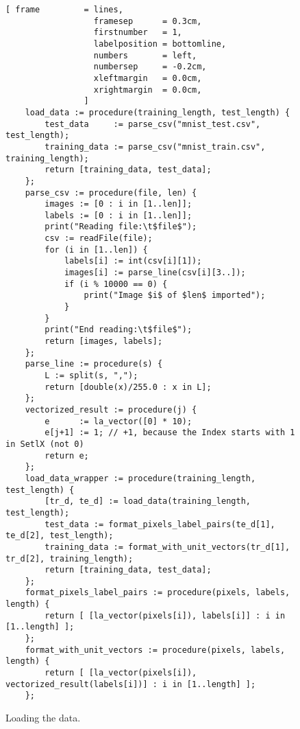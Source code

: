 \begin{figure}[!ht]
\centering
\begin{Verbatim}[ frame         = lines, 
                  framesep      = 0.3cm, 
                  firstnumber   = 1,
                  labelposition = bottomline,
                  numbers       = left,
                  numbersep     = -0.2cm,
                  xleftmargin   = 0.0cm,
                  xrightmargin  = 0.0cm,
                ]
    load_data := procedure(training_length, test_length) {
    	test_data     := parse_csv("mnist_test.csv",  test_length);
    	training_data := parse_csv("mnist_train.csv", training_length);
    	return [training_data, test_data];
    };
    parse_csv := procedure(file, len) {
        images := [0 : i in [1..len]];
        labels := [0 : i in [1..len]];
        print("Reading file:\t$file$");
        csv := readFile(file);
        for (i in [1..len]) {
            labels[i] := int(csv[i][1]);    
            images[i] := parse_line(csv[i][3..]);    
            if (i % 10000 == 0) {
                print("Image $i$ of $len$ imported");
            }
        }
        print("End reading:\t$file$");    
        return [images, labels];
    };
    parse_line := procedure(s) {
        L := split(s, ",");
        return [double(x)/255.0 : x in L];
    };
    vectorized_result := procedure(j) {
    	e      := la_vector([0] * 10);
    	e[j+1] := 1; // +1, because the Index starts with 1 in SetlX (not 0)
    	return e;
    };
    load_data_wrapper := procedure(training_length, test_length) {
    	[tr_d, te_d] := load_data(training_length, test_length);
    	test_data := format_pixels_label_pairs(te_d[1], te_d[2], test_length);
     	training_data := format_with_unit_vectors(tr_d[1], tr_d[2], training_length);
    	return [training_data, test_data];   
    };
    format_pixels_label_pairs := procedure(pixels, labels, length) {
    	return [ [la_vector(pixels[i]), labels[i]] : i in [1..length] ];
    };
    format_with_unit_vectors := procedure(pixels, labels, length) {
    	return [ [la_vector(pixels[i]), vectorized_result(labels[i])] : i in [1..length] ];
    };
\end{Verbatim}
\vspace*{-0.3cm}
\caption{Loading the data.}
\label{fig:nn-loader.stlx}
\end{figure}



